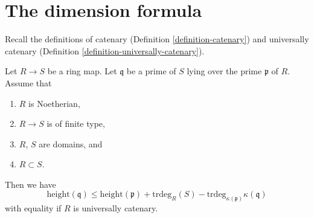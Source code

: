\section{The dimension formula}
\label{section-dimension-formula}

\noindent
Recall the definitions of catenary (Definition \ref{definition-catenary})
and universally catenary (Definition \ref{definition-universally-catenary}).

\begin{lemma}
\label{lemma-dimension-formula}
Let $R \to S$ be a ring map.
Let $\mathfrak q$ be a prime of $S$ lying over the prime $\mathfrak p$ of $R$.
Assume that
\begin{enumerate}
\item $R$ is Noetherian,
\item $R \to S$ is of finite type,
\item $R$, $S$ are domains, and
\item $R \subset S$.
\end{enumerate}
Then we have
$$
\text{height}(\mathfrak q)
\leq
\text{height}(\mathfrak p) + \text{trdeg}_{R}(S)
- \text{trdeg}_{\kappa(\mathfrak p)} \kappa(\mathfrak q)
$$
with equality if $R$ is universally catenary.
\end{lemma}

